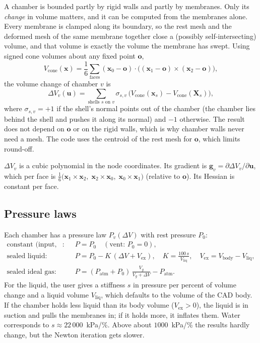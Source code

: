 \documentclass[11pt,a4paper]{article}
\newcommand{\vect}[1]{\bm{#1}}
\newcommand{\x}{\vect{x}}
\newcommand{\X}{\vect{X}}
\newcommand{\uu}{\vect{u}}
\newcommand{\g}{\vect{g}}
\newcommand{\dV}{\Delta V}
\theoremstyle{remark}
\begin{document}
A chamber is bounded partly by rigid walls and partly by membranes. Only its \emph{change} in
volume matters, and it can be computed from the membranes alone. Every membrane is clamped along
its boundary, so the rest mesh and the deformed mesh of the same membrane together close a
(possibly self-intersecting) volume, and that volume is exactly the volume the membrane has swept.
Using signed cone volumes about any fixed point $\vect{o}$,
\begin{equation}
V_{\text{cone}}(\x) = \frac16\sum_{\text{faces}} (\x_0-\vect{o})\cdot\big((\x_1-\vect{o})\times(\x_2-\vect{o})\big),
\end{equation}
the volume change of chamber $v$ is
\begin{equation}\label{eq:dV}
\dV_v(\uu) = \sum_{\text{shells } s \text{ on } v} \sigma_{s,v}\,\big(V_{\text{cone}}(\x_s) - V_{\text{cone}}(\X_s)\big),
\end{equation}
where $\sigma_{s,v}=+1$ if the shell's normal points out of the chamber (the chamber lies behind
the shell and pushes it along its normal) and $-1$ otherwise. The result does not depend on
$\vect{o}$ or on the rigid walls, which is why chamber walls never need a mesh. The code uses the
centroid of the rest mesh for $\vect{o}$, which limits round-off.

$\dV_v$ is a cubic polynomial in the node coordinates. Its gradient is
$\g_v = \partial\dV_v/\partial\uu$, which per face is
$\tfrac16\big(\x_1\times\x_2,\;\x_2\times\x_0,\;\x_0\times\x_1\big)$ (relative to $\vect{o}$). Its
Hessian is constant per face.

\subsection{Pressure laws}

Each chamber has a pressure law $P_v(\dV)$ with rest pressure $P_0$:
\begin{align}
\text{constant (input, vent)}:&\quad P = P_0 \quad(\text{vent: } P_0=0),\\
\text{sealed liquid}:&\quad P = P_0 - K\,(\dV + V_{\text{ex}}),
   \quad K = \frac{100\,s}{V_{\text{liq}}},\quad V_{\text{ex}} = V_{\text{body}} - V_{\text{liq}},
   \label{eq:liquid}\\
\text{sealed ideal gas}:&\quad P = (P_{\text{atm}} + P_0)\,\frac{V_g}{V_g + \dV} - P_{\text{atm}}.
   \label{eq:gas}
\end{align}
For the liquid, the user gives a stiffness $s$ in pressure per percent of volume change and a
liquid volume $V_{\text{liq}}$, which defaults to the volume of the CAD body. If the chamber holds
less liquid than its body volume ($V_{\text{ex}}>0$), the liquid is in suction and pulls the
membranes in; if it holds more, it inflates them. Water corresponds to $s\approx 22\,000$~kPa/\%.
Above about $1000$~kPa/\% the results hardly change, but the Newton iteration gets slower.
\end{document}
